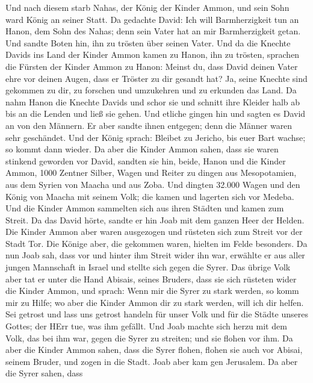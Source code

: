  Und nach diesem starb Nahas, der König der Kinder Ammon,
und sein Sohn ward König an seiner Statt.  Da gedachte
David: Ich will Barmherzigkeit tun an Hanon, dem Sohn des Nahas; denn
sein Vater hat an mir Barmherzigkeit getan. Und sandte Boten hin, ihn zu
trösten über seinen Vater. Und da die Knechte Davids ins Land der Kinder
Ammon kamen zu Hanon, ihn zu trösten,  sprachen die
Fürsten der Kinder Ammon zu Hanon: Meinst du, dass David deinen Vater
ehre vor deinen Augen, dass er Tröster zu dir gesandt hat? Ja, seine
Knechte sind gekommen zu dir, zu forschen und umzukehren und zu erkunden
das Land.  Da nahm Hanon die Knechte Davids und schor sie
und schnitt ihre Kleider halb ab bis an die Lenden und ließ sie gehen.
 Und etliche gingen hin und sagten es David an von den
Männern. Er aber sandte ihnen entgegen; denn die Männer waren sehr
geschändet. Und der König sprach: Bleibet zu Jericho, bis euer Bart
wachse; so kommt dann wieder.  Da aber die Kinder Ammon
sahen, dass sie waren stinkend geworden vor David, sandten sie hin,
beide, Hanon und die Kinder Ammon, 1000 Zentner Silber, Wagen und Reiter
zu dingen aus Mesopotamien, aus dem Syrien von Maacha und aus Zoba.
 Und dingten 32.000 Wagen und den König von Maacha mit
seinem Volk; die kamen und lagerten sich vor Medeba. Und die Kinder
Ammon sammelten sich aus ihren Städten und kamen zum Streit.
 Da das David hörte, sandte er hin Joab mit dem ganzen
Heer der Helden.  Die Kinder Ammon aber waren ausgezogen
und rüsteten sich zum Streit vor der Stadt Tor. Die Könige aber, die
gekommen waren, hielten im Felde besonders.  Da nun Joab
sah, dass vor und hinter ihm Streit wider ihn war, erwählte er aus aller
jungen Mannschaft in Israel und stellte sich gegen die Syrer.
 Das übrige Volk aber tat er unter die Hand Abisais,
seines Bruders, dass sie sich rüsteten wider die Kinder Ammon,
 und sprach: Wenn mir die Syrer zu stark werden, so komm
mir zu Hilfe; wo aber die Kinder Ammon dir zu stark werden, will ich dir
helfen.  Sei getrost und lass uns getrost handeln für
unser Volk und für die Städte unseres Gottes; der HErr tue, was ihm
gefällt.  Und Joab machte sich herzu mit dem Volk, das
bei ihm war, gegen die Syrer zu streiten; und sie flohen vor ihm.
 Da aber die Kinder Ammon sahen, dass die Syrer flohen,
flohen sie auch vor Abisai, seinem Bruder, und zogen in die Stadt. Joab
aber kam gen Jerusalem.  Da aber die Syrer sahen, dass
